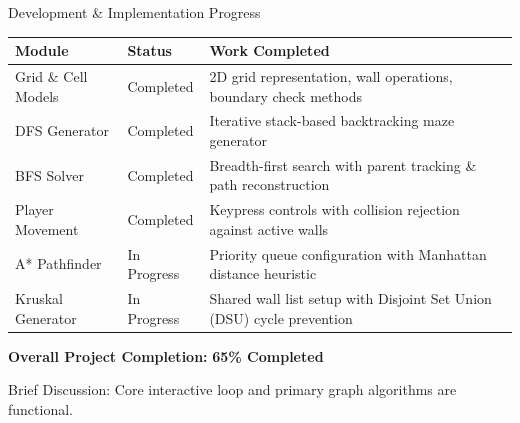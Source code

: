 \documentclass[aspectratio=169,11pt]{beamer}
\newcommand{\smallnote}[1]{%
\vspace{0.08cm}
{\scriptsize\color{GEUGrey}#1}
}
\begin{document}
\begin{frame}{Development \& Implementation Progress}

\scriptsize

\begin{center}

\renewcommand{\arraystretch}{1.05}

\begin{tabularx}{.96\textwidth}
{@{}R{3.0cm}R{1.8cm}Y@{}}

\toprule
\textbf{Module} &
\textbf{Status} &
\textbf{Work Completed}\\
\midrule

Grid \& Cell Models &
Completed &
2D grid representation, wall operations, boundary check methods\\

DFS Generator &
Completed &
Iterative stack-based backtracking maze generator\\

BFS Solver &
Completed &
Breadth-first search with parent tracking \& path reconstruction\\

Player Movement &
Completed &
Keypress controls with collision rejection against active walls\\

A* Pathfinder &
In Progress &
Priority queue configuration with Manhattan distance heuristic\\

Kruskal Generator &
In Progress &
Shared wall list setup with Disjoint Set Union (DSU) cycle prevention\\

\bottomrule

\end{tabularx}

\end{center}

\vspace{2mm}

\begin{center}
\colorbox{GEULightBlue}{
\parbox{.65\textwidth}{
\centering
\textbf{Overall Project Completion:}
\textbf{65\% Completed}
}}
\end{center}

\vfill

\smallnote{
Brief Discussion: Core interactive loop and primary graph algorithms are functional.
}

\end{frame}
\end{document}
